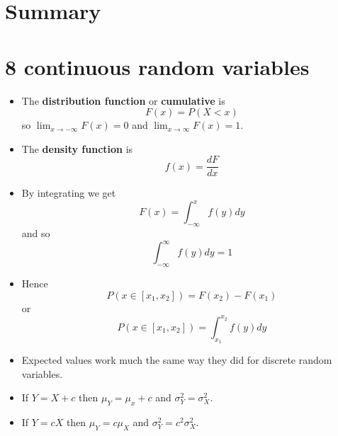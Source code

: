 
\ifind
\section*{Summary}
\else
\section*{8 continuous random variables}
\fi

\begin{itemize}

\item The \textbf{distribution function} or \textbf{cumulative} is
  \begin{equation}
F(x)=P(X<x)
  \end{equation}
  so $\lim_{x\rightarrow -\infty}F(x)=0$ and $\lim_{x\rightarrow \infty}F(x)=1$.
  

\item The \textbf{density function} is
  \begin{equation}
f(x)=\frac{dF}{dx}
  \end{equation}

\item By integrating we get
  \begin{equation}
    F(x)=\int_{-\infty}^x f(y)dy
  \end{equation}
  and so
  \begin{equation}
    \int_{-\infty}^\infty f(y)dy=1
  \end{equation}

\item Hence
  \begin{equation}
P(x\in [x_1,x_2])=F(x_2)-F(x_1)
\end{equation}
or
\begin{equation}
P(x\in [x_1,x_2])=\int_{x_1}^{x_2} f(y)dy
\end{equation}

\item Expected values work much the same way they did for discrete
  random variables.

\item If $Y=X+c$ then $\mu_Y=\mu_x+c$ and $\sigma_Y^2=\sigma_X^2$.

  \item If $Y=cX$ then $\mu_Y=c\mu_X$ and $\sigma_Y^2=c^2\sigma_X^2$.

    \end{itemize}

